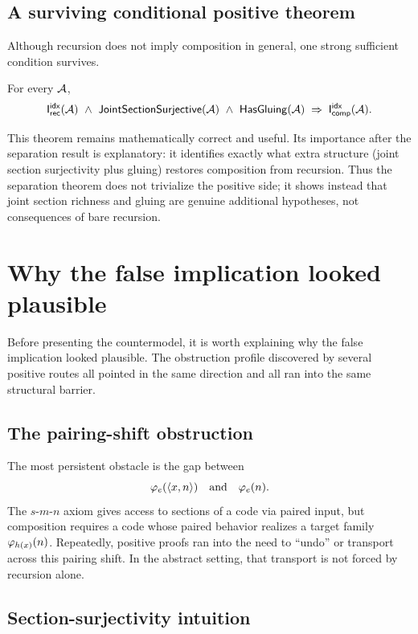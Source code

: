 \documentclass[11pt]{article}
\begin{document}
\subsection{A surviving conditional positive theorem}

Although recursion does not imply composition in general, one strong sufficient condition survives.

\begin{theorem}\label{thm:conditional-positive}
For every \(\mathcal{A}\),
\[
\IrecIdx(\aps)\ \wedge\ \JointSectionSurjective(\aps)\ \wedge\ \HasGluing(\aps)
\;\Rightarrow\;
\IcompIdx(\aps).
\]
\end{theorem}

This theorem remains mathematically correct and useful.  Its importance after the separation result is explanatory: it identifies exactly what extra structure (joint section surjectivity plus gluing) restores composition from recursion.  Thus the separation theorem does not trivialize the positive side; it shows instead that joint section richness and gluing are genuine additional hypotheses, not consequences of bare recursion.

\section{Why the false implication looked plausible}\label{sec:plausibility}

Before presenting the countermodel, it is worth explaining why the false implication looked plausible.  The obstruction profile discovered by several positive routes all pointed in the same direction and all ran into the same structural barrier.

\subsection{The pairing-shift obstruction}

The most persistent obstacle is the gap between
\[
\varphi_e(\langle x,n\rangle)
\quad\text{and}\quad
\varphi_e(n).
\]
The \(s\)-\(m\)-\(n\) axiom gives access to sections of a code via paired input, but composition requires a code whose paired behavior realizes a target family \(\varphi_{h(x)}(n)\).  Repeatedly, positive proofs ran into the need to ``undo'' or transport across this pairing shift.  In the abstract setting, that transport is not forced by recursion alone.

\subsection{Section-surjectivity intuition}
\end{document}
